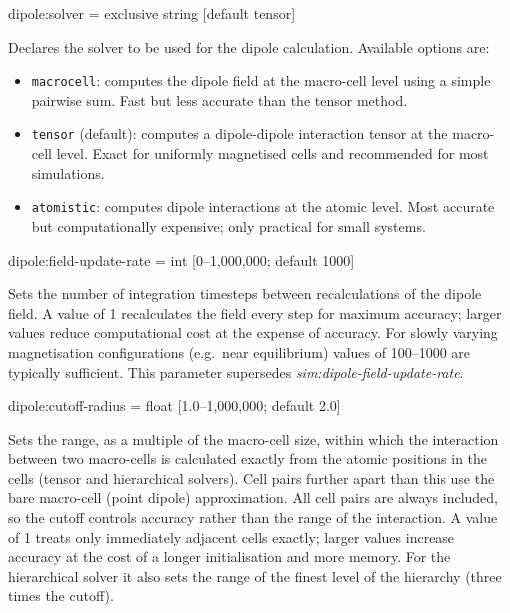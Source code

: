 {\zicf dipole:solver = exclusive string [default tensor]}
Declares the solver to be used for the dipole calculation. Available options are:
\begin{itemize}
  \item[] \texttt{macrocell}: computes the dipole field at the macro-cell level using a simple pairwise sum. Fast but less accurate than the tensor method.
  \item[] \texttt{tensor} (default): computes a dipole-dipole interaction tensor at the macro-cell level. Exact for uniformly magnetised cells and recommended for most simulations.
  \item[] \texttt{atomistic}: computes dipole interactions at the atomic level. Most accurate but computationally expensive; only practical for small systems.
\end{itemize}

{\zicf dipole:field-update-rate = int [0--1,000,000; default 1000]} Sets the number of integration timesteps between recalculations of the dipole field. A value of 1 recalculates the field every step for maximum accuracy; larger values reduce computational cost at the expense of accuracy. For slowly varying magnetisation configurations (e.g.\ near equilibrium) values of 100--1000 are typically sufficient. This parameter supersedes \textit{sim:dipole-field-update-rate}.

{\zicf dipole:cutoff-radius = float [1.0--1,000,000; default 2.0]} Sets the range, as a multiple of the macro-cell size, within which the interaction between two macro-cells is calculated exactly from the atomic positions in the cells (tensor and hierarchical solvers). Cell pairs further apart than this use the bare macro-cell (point dipole) approximation. All cell pairs are always included, so the cutoff controls accuracy rather than the range of the interaction. A value of 1 treats only immediately adjacent cells exactly; larger values increase accuracy at the cost of a longer initialisation and more memory. For the hierarchical solver it also sets the range of the finest level of the hierarchy (three times the cutoff).

